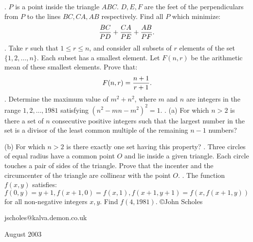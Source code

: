 \nopagenumbers
{}
\vskip 25pt
. $P$ is a point inside the triangle $ABC$. $D,E,F$ are the feet of the perpendiculars from $P$ to the lines $BC,CA,AB$ respectively. Find all $P$ which minimize: $${BC\over PD}+{CA\over PE}+{AB\over PF}.$$
\vskip 12pt
. Take $r$ such that $1\le r\le n$, and consider all subsets of $r$ elements of the set $\{1,2,\ldots,n\}$. Each subset has a smallest element. Let $F(n,r)$ be the arithmetic mean of these smallest elements. Prove that: $$F(n,r)={n+1\over r+1}.$$
\vskip 12pt
. Determine the maximum value of $m^2+n^2$, where $m$ and $n$ are integers in the range $1,2,\ldots,1981$ satisfying $(n^2-mn-m^2)^2=1$.
\vskip 12pt
. (a) For which $n>2$ is there a set of $n$ consecutive positive integers such that the largest number in the set is a divisor of the least common multiple of the remaining $n-1$ numbers?

(b) For which $n>2$ is there exactly one set having this property?
\vskip 12pt
. Three circles of equal radius have a common point $O$ and lie inside a given triangle. Each circle touches a pair of sides of the triangle. Prove that the incenter and the circumcenter of the triangle are collinear with the point $O$.
\vskip 12pt
. The function $f(x,y)$ satisfies: $f(0,y)=y+1, f(x+1,0) = f(x,1), f(x+1,y+1)=f(x,f(x+1,y))$ for all non-negative integers $x,y$. Find $f(4,1981)$.
\vskip 20pt
\noindent \copyright John Scholes

\noindent jscholes@kalva.demon.co.uk

 August 2003

\bye
